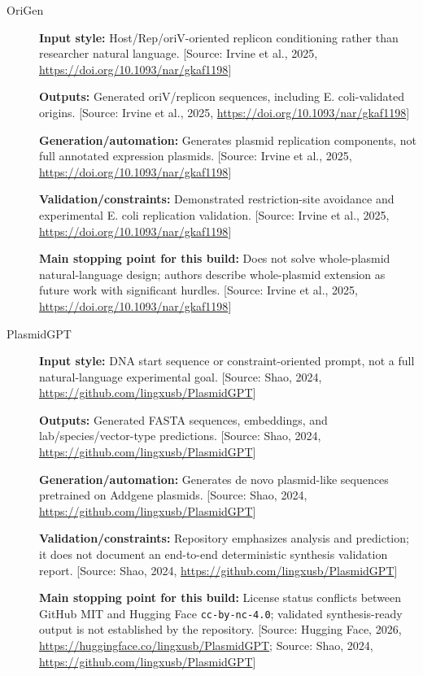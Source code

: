 \documentclass[11pt]{report}
\begin{document}
\begin{description}
\item[OriGen]
\textbf{Input style:} Host/Rep/oriV-oriented replicon conditioning rather than researcher natural language. [Source: Irvine et al., 2025, \url{https://doi.org/10.1093/nar/gkaf1198}]\par
\textbf{Outputs:} Generated oriV/replicon sequences, including E. coli-validated origins. [Source: Irvine et al., 2025, \url{https://doi.org/10.1093/nar/gkaf1198}]\par
\textbf{Generation/automation:} Generates plasmid replication components, not full annotated expression plasmids. [Source: Irvine et al., 2025, \url{https://doi.org/10.1093/nar/gkaf1198}]\par
\textbf{Validation/constraints:} Demonstrated restriction-site avoidance and experimental E. coli replication validation. [Source: Irvine et al., 2025, \url{https://doi.org/10.1093/nar/gkaf1198}]\par
\textbf{Main stopping point for this build:} Does not solve whole-plasmid natural-language design; authors describe whole-plasmid extension as future work with significant hurdles. [Source: Irvine et al., 2025, \url{https://doi.org/10.1093/nar/gkaf1198}]\par
\item[PlasmidGPT]
\textbf{Input style:} DNA start sequence or constraint-oriented prompt, not a full natural-language experimental goal. [Source: Shao, 2024, \url{https://github.com/lingxusb/PlasmidGPT}]\par
\textbf{Outputs:} Generated FASTA sequences, embeddings, and lab/species/vector-type predictions. [Source: Shao, 2024, \url{https://github.com/lingxusb/PlasmidGPT}]\par
\textbf{Generation/automation:} Generates de novo plasmid-like sequences pretrained on Addgene plasmids. [Source: Shao, 2024, \url{https://github.com/lingxusb/PlasmidGPT}]\par
\textbf{Validation/constraints:} Repository emphasizes analysis and prediction; it does not document an end-to-end deterministic synthesis validation report. [Source: Shao, 2024, \url{https://github.com/lingxusb/PlasmidGPT}]\par
\textbf{Main stopping point for this build:} License status conflicts between GitHub MIT and Hugging Face \texttt{cc-by-nc-4.0}; validated synthesis-ready output is not established by the repository. [Source: Hugging Face, 2026, \url{https://huggingface.co/lingxusb/PlasmidGPT}; Source: Shao, 2024, \url{https://github.com/lingxusb/PlasmidGPT}]\par

\end{description}
\end{document}
